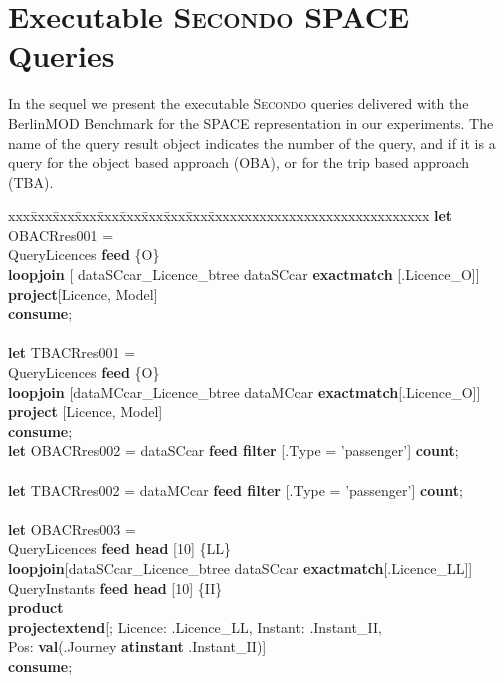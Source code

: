 \documentclass[a4paper]{article}
\newcommand{\secondo}{\textsc{Secondo}}
\newcommand{\bmodb} {BerlinMOD Benchmark}
\newcommand{\op}[1]{\textbf{#1}}
\begin{document}
\section{Executable \secondo{} SPACE Queries}
In the sequel we present the executable \secondo{} queries delivered with the
\bmodb{} for the SPACE representation in our experiments.
The name of the query result object indicates the number of
the query, and if it is a query for the object based approach (OBA), or for the
trip based approach (TBA).
\begin{scriptsize}
\begin{tabbing}
xxx\=xxx\=xxx\=xxx\=xxx\=xxx\=xxx\=xxx\=xxx\=xxxxxxxxxxxxxxxxxxxxxxxxxxxxxx\kill
\op{let} OBACRres001 = \\
\>QueryLicences \op{feed} \{O\}\\
\>\op{loopjoin} [ dataSCcar\_Licence\_btree dataSCcar \op{exactmatch} [.Licence\_O]]\\
\>\op{project}[Licence, Model]\\
\op{consume};\\
\\
\op{let} TBACRres001 = \\
\>QueryLicences \op{feed} \{O\}\\
\>\op{loopjoin} [dataMCcar\_Licence\_btree dataMCcar \op{exactmatch}[.Licence\_O]]\\
\>\op{project} [Licence, Model]\\
\op{consume};
\\
\op{let} OBACRres002 = dataSCcar \op{feed filter} [.Type = 'passenger'] \op{count};\\
\\
\op{let} TBACRres002 = dataMCcar \op{feed filter} [.Type = 'passenger'] \op{count};\\
\\
\op{let} OBACRres003 =\\
\>QueryLicences \op{feed head} [10] \{LL\}\\
\>\>\op{loopjoin}[dataSCcar\_Licence\_btree dataSCcar \op{exactmatch}[.Licence\_LL]]\\
\>QueryInstants \op{feed head} [10] \{II\}\\
\>\op{product}\\
\>\op{projectextend}[; Licence: .Licence\_LL, Instant: .Instant\_II,\\
\>\>\>\> Pos: \op{val}(.Journey \op{atinstant} .Instant\_II)]\\
\op{consume};\\
\\

\end{tabbing}
\end{scriptsize}
\end{document}
